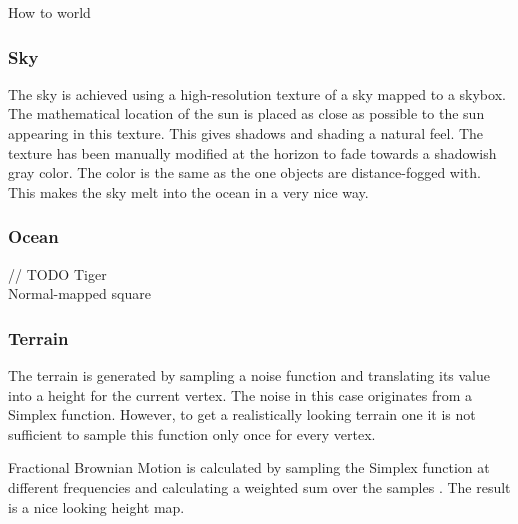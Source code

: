 How to world

\subsubsection{Sky}
The sky is achieved using a high-resolution texture of a sky mapped to a skybox. The mathematical location of the sun is placed as close as possible to the sun appearing in this texture. This gives shadows and shading a natural feel. The texture has been manually modified at the horizon to fade towards a shadowish gray color. The color is the same as the one objects are distance-fogged with. This makes the sky melt into the ocean in a very nice way. 

\subsubsection{Ocean}
// TODO  Tiger \\
Normal-mapped square

\subsubsection{Terrain}
The terrain is generated by sampling a noise function and translating its value into a height for the current vertex. The noise in this case originates from a Simplex function. However, to get a realistically looking terrain one it is not sufficient to sample this function only once for every vertex.

Fractional Brownian Motion is calculated by sampling the Simplex function at different frequencies and calculating a weighted sum over the samples \cite{FracBrownMotion}. The result is a nice looking height map. 

